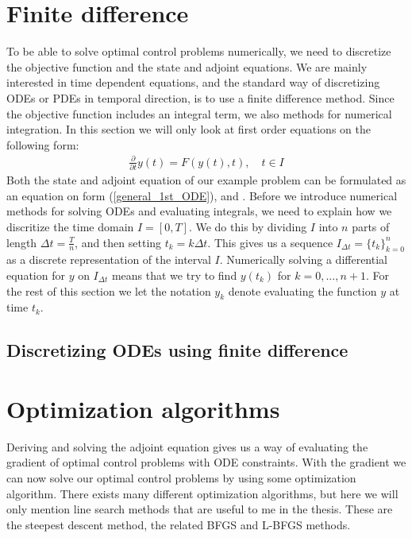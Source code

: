 \section{Finite difference}
To be able to solve optimal control problems numerically, we need to discretize the objective function and the state and adjoint equations. We are mainly interested in time dependent equations, and the standard way of discretizing ODEs or PDEs in temporal direction, is to use a finite difference method. Since the objective function includes an integral term, we also methods for numerical integration. In this section we will only look at first order equations on the following form:
\begin{align}
\frac{\partial}{\partial t} y(t) = F(y(t),t),\quad t\in I \label{general_1st_ODE}
\end{align}
Both the state and adjoint equation of our example problem can be formulated as an equation on form (\ref{general_1st_ODE}), and . Before we introduce numerical methods for solving ODEs and evaluating integrals, we need to explain how we discritize the time domain $I=[0,T]$. We do this by dividing $I$ into $n$ parts of length $\Delta t=\frac{T}{n}$, and then setting $t_k=k\Delta t$. This gives us a sequence $I_{\Delta t}=\{t_k\}_{k=0}^{n}$ as a discrete representation of the interval $I$. Numerically solving a differential equation for $y$ on $I_{\Delta t}$ means that we try to find $y(t_k)$ for $k=0,...,n+1$. For the rest of this section we let the notation $y_k$ denote evaluating the function $y$ at time $t_k$.
\subsection{Discretizing ODEs using finite difference}

\section{Optimization algorithms}
Deriving and solving the adjoint equation gives us a way of evaluating the gradient of optimal control problems with ODE constraints. With the gradient we can now solve our optimal control problems by using some optimization algorithm. There exists many different optimization algorithms, but here we will only mention line search methods that are useful to me in the thesis. These are the steepest descent method, the related BFGS and L-BFGS methods.  
